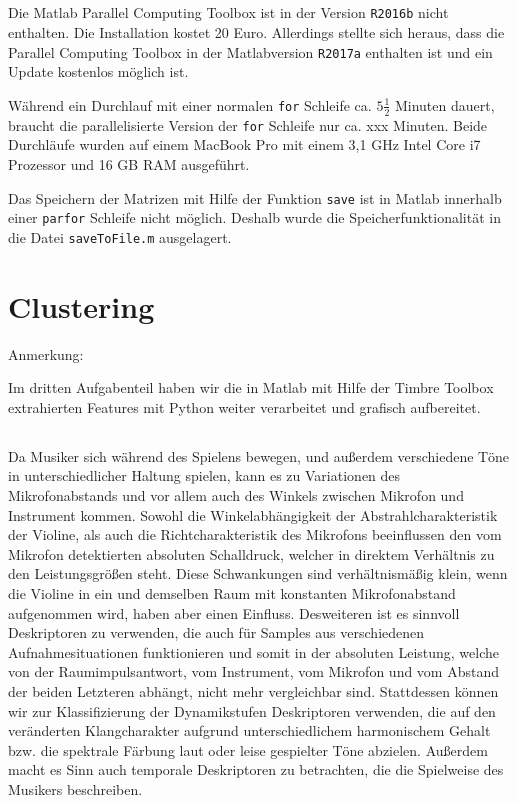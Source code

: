 \subsection{}
Die Matlab Parallel Computing Toolbox ist in der Version \texttt{R2016b} nicht enthalten.
Die Installation kostet 20 Euro.
Allerdings stellte sich heraus, dass die Parallel Computing Toolbox in der Matlabversion \texttt{R2017a} enthalten ist und ein Update kostenlos möglich ist.

Während ein Durchlauf mit einer normalen \texttt{for} Schleife ca. $5 \frac{1}{2}$ Minuten dauert, braucht die parallelisierte Version der \texttt{for} Schleife nur ca. xxx Minuten.
Beide Durchläufe wurden auf einem MacBook Pro mit einem 3,1 GHz Intel Core i7 Prozessor und 16 GB RAM ausgeführt.

Das Speichern der Matrizen mit Hilfe der Funktion \texttt{save} ist in Matlab innerhalb einer \texttt{parfor} Schleife nicht möglich.
Deshalb wurde die Speicherfunktionalität in die Datei \texttt{saveToFile.m} ausgelagert.

\section{Clustering}
\label{sec:cluster}

Anmerkung:

Im dritten Aufgabenteil haben wir die in Matlab mit Hilfe der Timbre Toolbox extrahierten Features mit Python weiter verarbeitet und grafisch aufbereitet.

\subsection{}

Da Musiker sich während des Spielens bewegen, und außerdem verschiedene Töne in unterschiedlicher Haltung spielen, kann es zu Variationen des Mikrofonabstands und vor allem auch des Winkels zwischen Mikrofon und Instrument kommen. 
Sowohl die Winkelabhängigkeit der Abstrahlcharakteristik der Violine, als auch die Richtcharakteristik des Mikrofons beeinflussen den vom Mikrofon detektierten absoluten Schalldruck, welcher in direktem Verhältnis zu den Leistungsgrößen steht. 
Diese Schwankungen sind verhältnismäßig klein, wenn die Violine in ein und demselben Raum mit konstanten Mikrofonabstand aufgenommen wird, haben aber einen Einfluss.
Desweiteren ist es sinnvoll Deskriptoren zu verwenden, die auch für Samples aus verschiedenen Aufnahmesituationen funktionieren und somit in der absoluten Leistung, welche von der Raumimpulsantwort, vom Instrument, vom Mikrofon und vom Abstand der beiden Letzteren abhängt, nicht mehr vergleichbar sind.
Stattdessen können wir zur Klassifizierung der Dynamikstufen Deskriptoren verwenden, die auf den veränderten Klangcharakter aufgrund unterschiedlichem harmonischem Gehalt bzw. die spektrale Färbung laut oder leise gespielter Töne abzielen.
Außerdem macht es Sinn auch temporale Deskriptoren zu betrachten, die die Spielweise des Musikers beschreiben.
